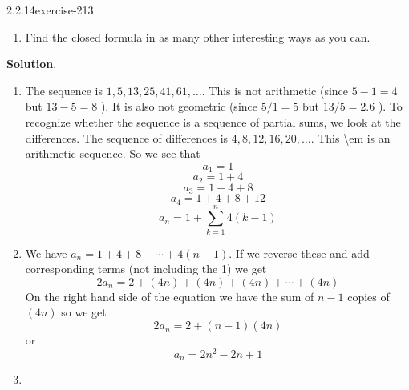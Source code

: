 \documentclass[twoside,11pt,]{book}
\numberwithin{equation}{chapter}
\begin{document}
\begin{divisionsolution}{2.2.14}{}{exercise-213}
\begin{enumerate}[label=(\alph*)]
Use your results from part (a) to find a closed formula for the sequence. Show your work. Note, while there are lots of ways to find a closed formula here, you should use partial sums specifically.%
\item\hypertarget{li-1912}{}\hypertarget{p-3275}{}%
Find the closed formula in as many other interesting ways as you can.%
\end{enumerate}
%
\par\smallskip%
\noindent\textbf{Solution}.\quad%
\hypertarget{p-3276}{}%
\leavevmode%
\begin{enumerate}[label=(\alph*)]
\item\hypertarget{li-1913}{}\hypertarget{p-3277}{}%
The sequence is \(1, 5, 13, 25, 41, 61, \ldots\). This is not arithmetic (since \(5-1 = 4\) but \(13-5 = 8\) ). It is also not geometric (since \(5/1 = 5\) but \(13/5 = 2.6\) ). To recognize whether the sequence is a sequence of partial sums, we look at the differences. The sequence of differences is \(4, 8, 12, 16, 20, \ldots\). This \textbraceleft{}\textbackslash{}em is\textbraceright{} an arithmetic sequence. So we see that%
\begin{equation*}
a_1 = 1
\end{equation*}
%
\begin{equation*}
a_2 = 1+4
\end{equation*}
%
\begin{equation*}
a_3 = 1+4+8
\end{equation*}
%
\begin{equation*}
a_4 = 1+4+8+12
\end{equation*}
%
\begin{equation*}
a_n = 1 + \sum_{k = 1}^n 4(k-1)
\end{equation*}
%
\item\hypertarget{li-1914}{}\hypertarget{p-3278}{}%
We have \(a_n = 1 + 4 + 8 + \cdots + 4(n-1)\). If we reverse these and add corresponding terms (not including the 1) we get%
\begin{equation*}
2a_n = 2 + (4n) + (4n) + (4n) + \cdots + (4n)
\end{equation*}
On the right hand side of the equation we have the sum of \(n-1\) copies of \((4n)\) so we get%
\begin{equation*}
2a_n = 2 + (n-1)(4n)
\end{equation*}
or%
\begin{equation*}
a_n = 2n^2 - 2n + 1
\end{equation*}
%
\item\hypertarget{li-1915}{}\hypertarget{p-3279}{}%

\end{enumerate}
\end{divisionsolution}
\end{document}

